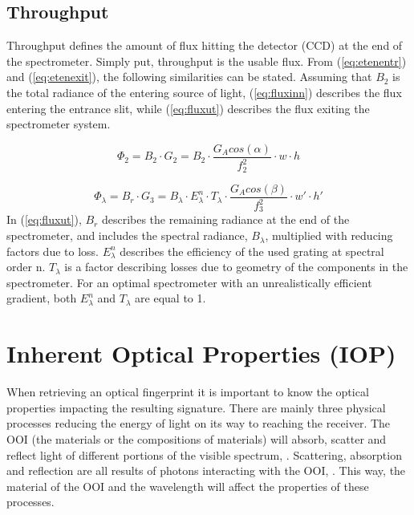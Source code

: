 \subsection{Throughput} \label{sec:tput}
Throughput defines the amount of flux hitting the detector (CCD) at the end of the spectrometer. Simply put, throughput is the usable flux. From (\ref{eq:etenentr}) and (\ref{eq:etenexit}), the following similarities can be stated. Assuming that $B_2$ is the total radiance of the entering source of light, (\ref{eq:fluxinn}) describes the flux entering the entrance slit, while (\ref{eq:fluxut}) describes the flux exiting the spectrometer system. 

\begin{equation}
    \Phi_2 = B_2 \cdot G_2 = B_2 \cdot \frac{G_A cos(\alpha)}{f_2^2} \cdot w \cdot h
    \label{eq:fluxinn}
\end{equation}

\begin{equation}
    \Phi_{\lambda} = B_{r} \cdot G_3 = B_{\lambda}\cdot E_{\lambda}^n \cdot T_{\lambda} \cdot \frac{G_A cos(\beta)}{f_3^2} \cdot w' \cdot h'
    \label{eq:fluxut}
\end{equation}
\noindent
In (\ref{eq:fluxut}), $B_{r}$ describes the remaining radiance at the end of the spectrometer, and includes the spectral radiance, $B_{\lambda}$,  multiplied with reducing factors due to loss. $E_{\lambda}^n$ describes the efficiency of the used grating at spectral order n. $T_{\lambda}$ is a factor describing losses due to geometry of the components in the spectrometer. For an optimal spectrometer with an unrealistically efficient gradient, both $E_{\lambda}^n$ and $T_{\lambda}$ are equal to 1.

\section{Inherent Optical Properties (IOP)}
When retrieving an optical fingerprint it is important to know the optical properties impacting the resulting signature. There are mainly three physical processes reducing the energy of light on its way to reaching the receiver. The OOI (the materials or the compositions of materials) will absorb, scatter and reflect light of different portions of the visible spectrum, \cite{williams_1973}. Scattering, absorption and reflection are all results of photons interacting with the OOI, \cite{mobley_2010}. This way, the material of the OOI and the wavelength will affect the properties of these processes. 

